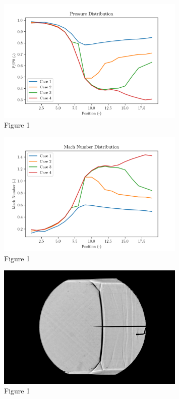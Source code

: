 \documentclass[8pt]{article}
\begin{document}
\begin{figure}[H]
    \centering
    \includegraphics[width=0.8\textwidth]{pressure_ratio_distribution_corrected.png}
    \caption{Figure 1}
    \label{fig:figure4}
\end{figure}

\begin{figure}[H]
    \centering
    \includegraphics[width=0.8\textwidth]{mach_number_distribution_corrected.png}
    \caption{Figure 1}
    \label{fig:figure5}
\end{figure}

\begin{figure}[H]
    \centering
    \includegraphics[width=0.8\textwidth]{starting_shock.jpg}
    \caption{Figure 1}
    \label{fig:figure6}
\end{figure}
\end{document}
